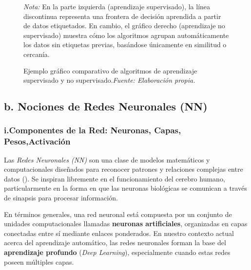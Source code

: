 \documentclass[11pt]{article} %
\begin{document}
\begin{figure}[H]

\caption{Ejemplo gráfico comparativo de algoritmos de aprendizaje supervisado y no supervisado.\textit{Fuente: Elaboración propia.}}
\label{fig:aprendizaje-supervisado-no-supervisado}
\vspace{2mm}

\small\textit{Nota:} En la parte izquierda (aprendizaje supervisado), la línea discontinua representa una frontera de decisión aprendida a partir de datos etiquetados. En cambio, el gráfico derecho (aprendizaje no supervisado) muestra cómo los algoritmos agrupan automáticamente los datos sin etiquetas previas, basándose únicamente en similitud o cercanía.

\end{figure}
\subsection{b. Nociones de Redes Neuronales (NN)}
\vspace{5pt}

\subsubsection{i.Componentes de la Red: Neuronas, Capas, Pesos,Activación} 
\vspace{3pt}
Las \textit{Redes Neuronales (NN)} son una clase de modelos matemáticos y computacionales diseñados para reconocer patrones y relaciones complejas entre datos (\cite{sanchez}). Se inspiran libremente en el funcionamiento del cerebro humano, particularmente en la forma en que las neuronas biológicas se comunican a través de sinapsis para procesar información.

En términos generales, una red neuronal está compuesta por un conjunto de unidades computacionales llamadas \textbf{neuronas artificiales}, organizadas en capas conectadas entre sí mediante enlaces ponderados. En nuestro contexto actual acerca del aprendizaje automático, las redes neuronales forman la base del \textbf{aprendizaje profundo} (\textit{Deep Learning}), especialmente cuando estas redes poseen múltiples capas.
\end{document}
